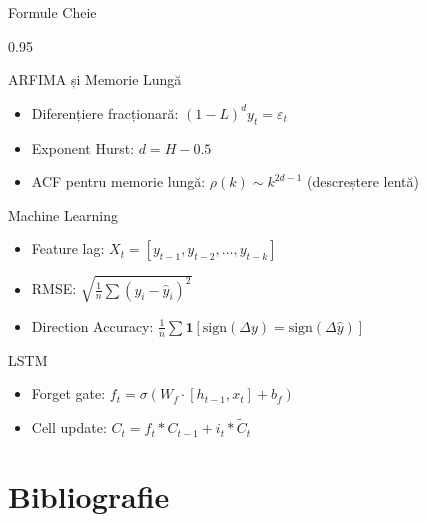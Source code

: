 \documentclass[9pt, aspectratio=169, t]{beamer}
\begin{document}
\begin{frame}{Formule Cheie}
    \begin{cminipage}{0.95\textwidth}
    \vspace{-3mm}
    {\footnotesize
    \begin{block}{ARFIMA și Memorie Lungă}
        \begin{itemize}\setlength{\itemsep}{0pt}\parsep=0pt
            \item Diferențiere fracționară: $(1-L)^d y_t = \varepsilon_t$
            \item Exponent Hurst: $d = H - 0.5$
            \item ACF pentru memorie lungă: $\rho(k) \sim k^{2d-1}$ (descreștere lentă)
        \end{itemize}
    \end{block}
    \vspace{-1mm}
    \begin{block}{Machine Learning}
        \begin{itemize}\setlength{\itemsep}{0pt}\parsep=0pt
            \item Feature lag: $X_t = [y_{t-1}, y_{t-2}, \ldots, y_{t-k}]$
            \item RMSE: $\sqrt{\frac{1}{n}\sum(y_i - \hat{y}_i)^2}$
            \item Direction Accuracy: $\frac{1}{n}\sum \mathbf{1}[\text{sign}(\Delta y) = \text{sign}(\Delta \hat{y})]$
        \end{itemize}
    \end{block}
    \vspace{-1mm}
    \begin{block}{LSTM}
        \begin{itemize}\setlength{\itemsep}{0pt}\parsep=0pt
            \item Forget gate: $f_t = \sigma(W_f \cdot [h_{t-1}, x_t] + b_f)$
            \item Cell update: $C_t = f_t * C_{t-1} + i_t * \tilde{C}_t$
        \end{itemize}
    \end{block}
    }
    \end{cminipage}
\end{frame}
\section{Bibliografie}
\end{document}
